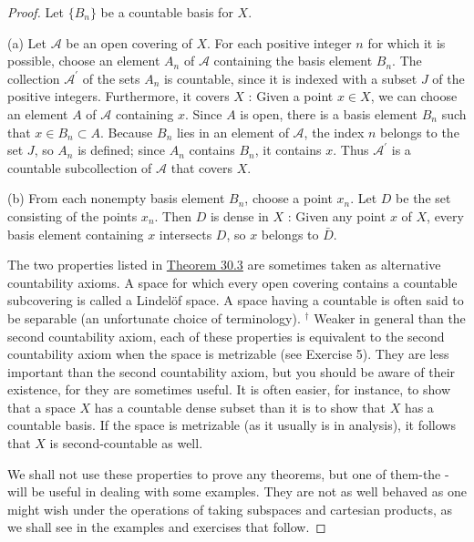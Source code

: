 \begin{proof}
Let \(\{ B_{n}\}\) be a countable basis for \(X\).

(a) Let \(\mathcal{A}\) be an open covering of \(X\). For each positive integer \(n\) for which it is possible, choose an element \(A_{n}\) of \(\mathcal{A}\) containing the basis element \(B_{n}\). The collection \(\mathcal{A}^{\prime }\) of the sets \(A_{n}\) is countable, since it is indexed with a subset \(J\) of the positive integers. Furthermore, it covers \(X\) : Given a point \(x \in X\), we can choose an element \(A\) of \(\mathcal{A}\) containing \(x\). Since \(A\) is open, there is a basis element \(B_{n}\) such that \(x \in {B}_{n} \subset A\). Because \(B_{n}\) lies in an element of \(\mathcal{A}\), the index \(n\) belongs to the set \(J\), so \(A_{n}\) is defined; since \(A_{n}\) contains \(B_{n}\), it contains \(x\). Thus \(\mathcal{A}^{\prime }\) is a countable subcollection of \(\mathcal{A}\) that covers \(X\).

(b) From each nonempty basis element \(B_{n}\), choose a point \(x_{n}\). Let \(D\) be the set consisting of the points \(x_{n}\). Then \(D\) is dense in \(X\) : Given any point \(x\) of \(X\), every basis element containing \(x\) intersects \(D\), so \(x\) belongs to \(\bar{D}\).

The two properties listed in \hyperref[thm:30.3]{Theorem 30.3} are sometimes taken as alternative countability axioms. A space for which every open covering contains a countable subcovering is called a Lindelöf space. A space having a countable  is often said to be separable (an unfortunate choice of terminology). ${}^{\dagger}$ Weaker in general than the second countability axiom, each of these properties is equivalent to the second countability axiom when the space is metrizable (see Exercise 5). They are less important than the second countability axiom, but you should be aware of their existence, for they are sometimes useful. It is often easier, for instance, to show that a space \(X\) has a countable dense subset than it is to show that \(X\) has a countable basis. If the space is metrizable (as it usually is in analysis), it follows that \(X\) is second-countable as well.

We shall not use these properties to prove any theorems, but one of them-the -will be useful in dealing with some examples. They are not as well behaved as one might wish under the operations of taking subspaces and cartesian products, as we shall see in the examples and exercises that follow.
\end{proof}

